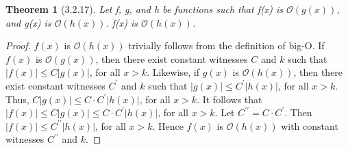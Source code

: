 \documentclass[a4paper, 12pt]{article}
\theoremstyle{plain}
\newtheorem*{theorem*}{Theorem}
\begin{document}
	
	\begin{theorem*}[3.2.17]
		Let f, g, and h be functions such that f(x) is $\mathcal{O}(g(x))$, and g(x) is $\mathcal{O}(h(x))$. f(x) is $\mathcal{O}(h(x))$.
	\end{theorem*}
	
	\begin{proof}
		$f(x)$ is $\mathcal{O}(h(x))$ trivially follows from the definition of big-O. If $f(x)$ is $\mathcal{O}(g(x))$, then there exist constant witnesses $C$ and $k$ such that \newline $|f(x)| \le C|g(x)|$, for all $x > k$. Likewise, if $g(x)$ is $\mathcal{O}(h(x))$, then there exist constant witnesses $C^\prime$ and $k$ such that $|g(x)| \le C^\prime |h(x)|$, for all $x > k$. Thus, $C|g(x)| \le C \cdot C^\prime |h(x)|$, for all $x > k$.
		It follows that \newline $|f(x)| \le C|g(x)| \le C \cdot C^\prime|h(x)|$, for all $x > k$. Let $C^{\prime\prime} = C \cdot C^\prime$. Then $|f(x)| \le C^{\prime\prime}|h(x)|$, for all $x > k$. Hence $f(x)$ is $\mathcal{O}(h(x))$ with constant witnesses $C^{\prime\prime}$ and $k$.
	\end{proof}
\end{document}
